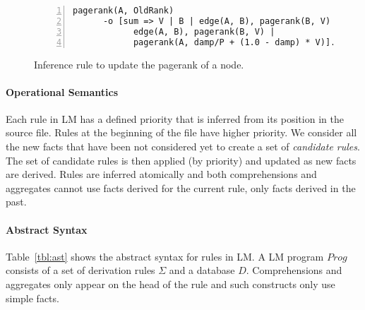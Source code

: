 \begin{figure}[h]
\stuffsize\begin{Verbatim}[numbers=left]
pagerank(A, OldRank)
      -o [sum => V | B | edge(A, B), pagerank(B, V) |
            edge(A, B), pagerank(B, V) |
            pagerank(A, damp/P + (1.0 - damp) * V)].
\end{Verbatim}
\caption{Inference rule to update the pagerank of a node.}
  \label{code:pagerank}
\end{figure}

\paragraph{Operational Semantics} Each rule in LM has a defined priority that is
inferred from its position in the source file.  Rules at the beginning of the
file have higher priority. We consider all the new facts that have been not
considered yet to create a set of \emph{candidate rules}.  The set of candidate
rules is then applied (by priority) and updated as new facts are derived.  Rules
are inferred atomically and both comprehensions and aggregates cannot use facts
derived for the current rule, only facts derived in the past.

\paragraph{Abstract Syntax}

Table~\ref{tbl:ast} shows the abstract syntax for rules in LM.
A LM program $Prog$ consists of a set of derivation rules $\Sigma$ and a database $D$.
Comprehensions and aggregates only appear on the head of the rule and such
constructs only use simple facts.


